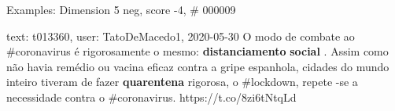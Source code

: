 \begin{frame}{Examples: Dimension 5 neg, score -4, \# 000009}
\footnotesize
\begin{alertblock}{text: t013360, user: TatoDeMacedo1, 2020-05-30}
O modo de combate ao \#coronavirus é rigorosamente o mesmo: 
\textbf{distanciamento} \textbf{social} . Assim como não havia remédio ou 
vacina eficaz contra a gripe espanhola, cidades do mundo inteiro tiveram de 
fazer \textbf{quarentena} rigorosa, o \#lockdown, repete -se a necessidade 
contra o \#coronavirus. https://t.co/8zi6tNtqLd 
\end{alertblock}
\end{frame}
